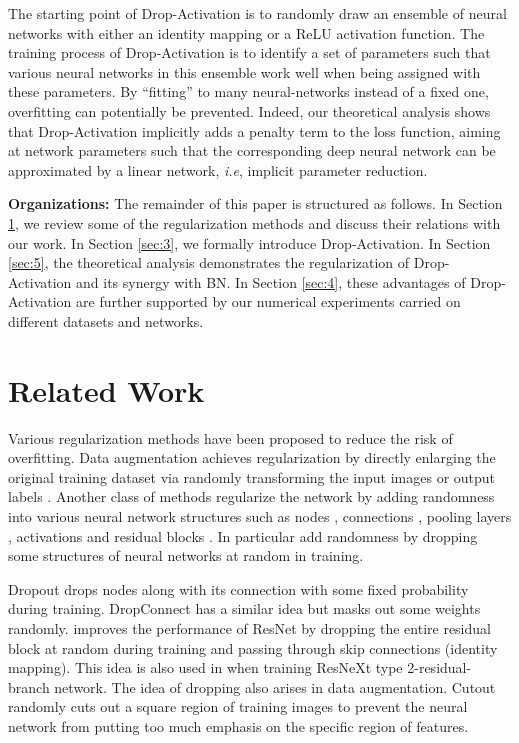 \documentclass[11pt]{article}
\def\ie{\emph{i.e}}
\begin{document}
The starting point of Drop-Activation is to randomly draw an ensemble of neural networks with either an identity mapping or a ReLU activation function. The training process of Drop-Activation is to identify a set of parameters such that various neural networks in this ensemble work well when being assigned with these parameters. By ``fitting'' to many neural-networks instead of a fixed one, overfitting can potentially be prevented. Indeed, our theoretical analysis shows that Drop-Activation implicitly adds a penalty term to the loss function, aiming at network parameters such that the corresponding deep neural network can be approximated by a linear network, \ie, implicit parameter reduction.

\textbf{Organizations:} The remainder of this paper is structured as follows. In Section \ref{sec:2}, we review some of the regularization methods and discuss their relations with our work. In Section \ref{sec:3}, we formally introduce Drop-Activation. In Section \ref{sec:5}, the theoretical analysis demonstrates the regularization of Drop-Activation and its synergy with BN. In Section \ref{sec:4}, these advantages of Drop-Activation are further supported by our numerical experiments carried on different datasets and networks.

\section{Related Work}
\label{sec:2}
Various regularization methods have been proposed to reduce the risk of overfitting. Data augmentation achieves regularization by directly enlarging the original training dataset via randomly transforming the input images \cite{verydeep, simonyan2014very, cutout, autoaugment} or output labels \cite{mixup, disturblabel}. Another class of methods regularize the network by adding randomness into various neural network structures such as nodes \cite{dropout}, connections \cite{dropconnect}, pooling layers \cite{pool}, activations \cite{rrelu} and residual blocks \cite{shake, stochasticdepth, shakedrop}. In particular \cite{dropout, cutout, stochasticdepth, shakedrop, dropconnect, swapout, zoneout} add randomness by dropping some structures of neural networks at random in training.

Dropout \cite{dropout} drops nodes along with its connection with some fixed probability during training. DropConnect \cite{dropconnect} has a similar idea but masks out some weights randomly. \cite{stochasticdepth} improves the performance of ResNet \cite{resnet} by dropping the entire residual block at random during training and passing through skip connections (identity mapping). This idea is also used in \cite{shakedrop} when training ResNeXt \cite{resnext} type 2-residual-branch network. The idea of dropping also arises in data augmentation. Cutout \cite{cutout} randomly cuts out a square region of training images to prevent the neural network from putting too much emphasis on the specific region of features.
\end{document}
